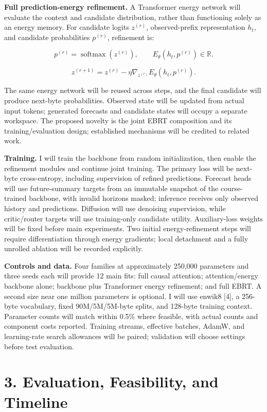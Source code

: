\documentclass[11pt,letterpaper]{article}
\begin{document}
\textbf{Full prediction-energy refinement.} A Transformer energy network will evaluate the context and candidate distribution, rather than functioning solely as an energy memory. For candidate logits \(z^{(r)}\), observed-prefix representation \(h_t\), and candidate probabilities \(p^{(r)}\), refinement is:

\[
p^{(r)}=\operatorname{softmax}(z^{(r)}),\qquad
E_\theta(h_t,p^{(r)})\in\mathbb{R}.
\]

\[
z^{(r+1)}=z^{(r)}-\eta\nabla_{z^{(r)}}E_\theta(h_t,p^{(r)}).
\]

The same energy network will be reused across steps, and the final candidate will produce next-byte probabilities. Observed state will be updated from actual input tokens; generated forecasts and candidate states will occupy a separate workspace. The proposed novelty is the joint EBRT composition and its training/evaluation design; established mechanisms will be credited to related work.

\textbf{Training.} I will train the backbone from random initialization, then enable the refinement modules and continue joint training. The primary loss will be next-byte cross-entropy, including supervision of refined predictions. Forecast heads will use future-summary targets from an immutable snapshot of the course-trained backbone, with invalid horizons masked; inference receives only observed history and predictions. Diffusion will use denoising supervision, while critic/router targets will use training-only candidate utility. Auxiliary-loss weights will be fixed before main experiments. Two initial energy-refinement steps will require differentiation through energy gradients; local detachment and a fully unrolled ablation will be recorded explicitly.

\textbf{Controls and data.} Four families at approximately 250,000 parameters and three seeds each will provide 12 main fits: full causal attention; attention/energy backbone alone; backbone plus Transformer energy refinement; and full EBRT. A second size near one million parameters is optional. I will use enwik8 [4], a 256-byte vocabulary, fixed 90M/5M/5M-byte splits, and 128-byte training context. Parameter counts will match within 0.5\% where feasible, with actual counts and component costs reported. Training streams, effective batches, AdamW, and learning-rate search allowances will be paired; validation will choose settings before test evaluation.

\newpage
\section*{3. Evaluation, Feasibility, and Timeline}
\end{document}
